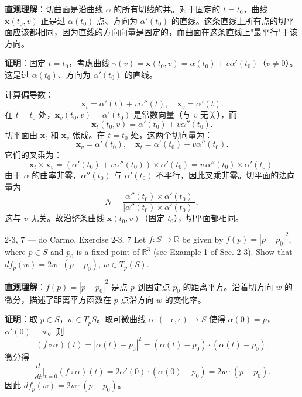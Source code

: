 \begin{solution}
\textbf{直观理解}：切曲面是沿曲线 $\alpha$ 的所有切线的并。对于固定的 $t = t_0$，曲线 $\mathbf{x}(t_0, v)$ 正是过 $\alpha(t_0)$ 点、方向为 $\alpha'(t_0)$ 的直线。这条直线上所有点的切平面应该都相同，因为直线的方向向量是固定的，而曲面在这条直线上"最平行"于该方向。

\textbf{证明}：固定 $t = t_0$，考虑曲线 $\gamma(v) = \mathbf{x}(t_0, v) = \alpha(t_0) + v\alpha'(t_0)$（$v \neq 0$）。这是过 $\alpha(t_0)$、方向为 $\alpha'(t_0)$ 的直线。

计算偏导数：
\[
\mathbf{x}_t = \alpha'(t) + v\alpha''(t), \quad \mathbf{x}_v = \alpha'(t).
\]
在 $t = t_0$ 处，$\mathbf{x}_v(t_0, v) = \alpha'(t_0)$ 是常数向量（与 $v$ 无关），而
\[
\mathbf{x}_t(t_0, v) = \alpha'(t_0) + v\alpha''(t_0).
\]
切平面由 $\mathbf{x}_t$ 和 $\mathbf{x}_v$ 张成。在 $t = t_0$ 处，这两个切向量为：
\[
\mathbf{x}_v = \alpha'(t_0), \quad \mathbf{x}_t = \alpha'(t_0) + v\alpha''(t_0).
\]
它们的叉乘为：
\[
\mathbf{x}_t \times \mathbf{x}_v = (\alpha'(t_0) + v\alpha''(t_0)) \times \alpha'(t_0) = v\,\alpha''(t_0) \times \alpha'(t_0).
\]
由于 $\alpha$ 的曲率非零，$\alpha''(t_0)$ 与 $\alpha'(t_0)$ 不平行，因此叉乘非零。切平面的法向量为
\[
N = \frac{\alpha''(t_0) \times \alpha'(t_0)}{|\alpha''(t_0) \times \alpha'(t_0)|},
\]
这与 $v$ 无关。故沿整条曲线 $\mathbf{x}(t_0, v)$（固定 $t_0$），切平面都相同。
\end{solution}

\begin{exercise}{2-3, 7 — do Carmo, Exercise 2-3, 7}
Let $f: S \to \mathbb{R}$ be given by $f(p) = |p - p_0|^2$, where $p \in S$ and $p_0$ is a fixed point of $\mathbb{R}^3$ (see Example 1 of Sec. 2-3). Show that $df_p(w) = 2w \cdot (p - p_0)$, $w \in T_p(S)$.
\end{exercise}

\begin{solution}
\textbf{直观理解}：$f(p) = |p - p_0|^2$ 是点 $p$ 到固定点 $p_0$ 的距离平方。沿着切方向 $w$ 的微分，描述了距离平方函数在 $p$ 点沿方向 $w$ 的变化率。

\textbf{证明}：取 $p \in S$，$w \in T_pS$。取可微曲线 $\alpha: (-\epsilon, \epsilon) \to S$ 使得 $\alpha(0) = p$，$\alpha'(0) = w$。则
\[
(f \circ \alpha)(t) = |\alpha(t) - p_0|^2 = (\alpha(t) - p_0) \cdot (\alpha(t) - p_0).
\]
微分得
\[
\frac{d}{dt}\bigg|_{t=0} (f \circ \alpha)(t) = 2\alpha'(0) \cdot (\alpha(0) - p_0) = 2w \cdot (p - p_0).
\]
因此 $df_p(w) = 2w \cdot (p - p_0)$。
\end{solution}

